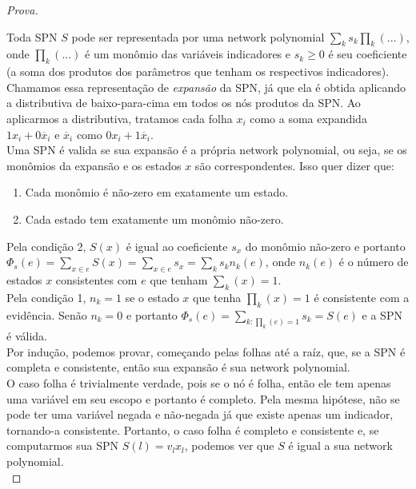 \documentclass[a4paper,10pt]{article}
\theoremstyle{plain}
\begin{document}
\begin{proof}[Prova]
  $ $\newline

  Toda SPN $S$ pode ser representada por uma network polynomial $\sum_k s_k \prod_k (...)$, onde
  $\prod_k (...)$ é um monômio das variáveis indicadores e $s_k \geq 0$ é seu coeficiente (a soma
  dos produtos dos parâmetros que tenham os respectivos indicadores). Chamamos essa representação
  de \textit{expansão} da SPN, já que ela é obtida aplicando a distributiva de baixo-para-cima em
  todos os nós produtos da SPN. Ao aplicarmos a distributiva, tratamos cada folha $x_i$ como a soma
  expandida $1x_i + 0\overline{x}_i$ e $\overline{x}_i$ como $0x_i + 1\overline{x}_i$.\\

  Uma SPN é valida se sua expansão é a própria network polynomial, ou seja, se os monômios da
  expansão e os estados $x$ são correspondentes. Isso quer dizer que:

  \begin{enumerate}
    \item Cada monômio é não-zero em exatamente um estado.
    \item Cada estado tem exatamente um monômio não-zero.
  \end{enumerate}

  Pela condição 2, $S(x)$ é igual ao coeficiente $s_x$ do monômio não-zero e portanto $\Phi_s(e) =
  \sum_{x \in e} S(x) = \sum_{x \in e} s_x = \sum_k s_k n_k (e)$, onde $n_k(e)$ é o número de
  estados $x$ consistentes com $e$ que tenham $\sum_k(x)=1$.\\

  Pela condição 1, $n_k=1$ se o estado $x$ que tenha $\prod_k(x)=1$ é consistente com a evidência.
  Senão $n_k=0$ e portanto $\Phi_s(e)=\sum_{k:\prod_k(e)=1}s_k=S(e)$ e a SPN é válida.\\

  Por indução, podemos provar, começando pelas folhas até a raíz, que, se a SPN é completa e
  consistente, então sua expansão é sua network polynomial.\\

  O caso folha é trivialmente verdade, pois se o nó é folha, então ele tem apenas uma variável em
  seu escopo e portanto é completo. Pela mesma hipótese, não se pode ter uma variável negada e
  não-negada já que existe apenas um indicador, tornando-a consistente. Portanto, o caso folha é
  completo e consistente e, se computarmos sua SPN $S(l)=v_lx_l$, podemos ver que $S$ é igual a sua
  network polynomial.\\


\end{proof}
\end{document}
